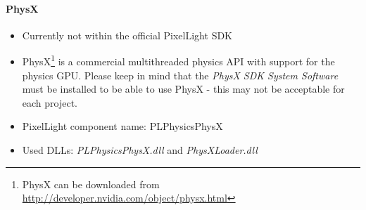 \paragraph{PhysX}
\begin{itemize}
\item Currently not within the official PixelLight \ac{SDK}
\item PhysX\footnote{PhysX can be downloaded from \url{http://developer.nvidia.com/object/physx.html}} is a commercial multithreaded physics \ac{API} with support for the physics \ac{GPU}. Please keep in mind that the \emph{PhysX \ac{SDK} System Software} must be installed to be able to use PhysX - this may not be acceptable for each project.
\item PixelLight component name: PLPhysicsPhysX
\item Used \ac{DLL}s: \emph{PLPhysicsPhysX.dll} and \emph{PhysXLoader.dll}
\end{itemize}
